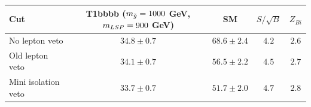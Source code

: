 \documentclass{beamer}
\begin{document}
\begin{frame}
\begin{center}
  \begin{tabular}{lcccc}
    \hline
    \hline
    Cut & T1bbbb ($m_{\tilde{g}}=1000$ GeV, $m_{LSP}=900$ GeV) & SM & $S/\sqrt{B}$ & $Z_{Bi}$ \\ \hline
No lepton veto & $34.8 \pm 0.7$ & $68.6 \pm 2.4$ &  $4.2$ & $2.6$  \\\hline
Old lepton veto & $34.1 \pm 0.7$ & $56.5 \pm 2.2$ &  $4.5$ & $2.7$  \\
Mini isolation veto & $33.7 \pm 0.7$ & $51.7 \pm 2.0$ &  $4.7$ & $2.8$  \\
    \hline
    \hline
  \end{tabular}
  \end{center}
 
\end{frame}
\end{document}
